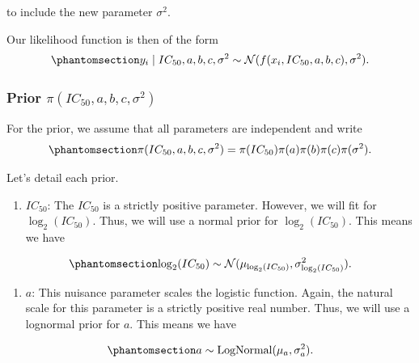 \documentclass[
]{scrartcl}
\providecommand{\tightlist}{%
  \setlength{\itemsep}{0pt}\setlength{\parskip}{0pt}}\usepackage{longtable,booktabs,array}
\begin{document}
to include the new parameter \(\sigma^2\).

Our likelihood function is then of the form
\begin{equation}\phantomsection\label{eq-iwasawa-likelihood-error-model}{
y_i \mid IC_{50}, a, b, c, \sigma^2 \sim 
\mathcal{N}(f(x_i, IC_{50}, a, b, c), \sigma^2).
}\end{equation}

\subsubsection{\texorpdfstring{Prior
\(\pi(IC_{50}, a, b, c, \sigma^2)\)}{Prior \textbackslash pi(IC\_\{50\}, a, b, c, \textbackslash sigma\^{}2)}}\label{prior-piic_50-a-b-c-sigma2}

For the prior, we assume that all parameters are independent and write
\begin{equation}\phantomsection\label{eq-iwasawa-prior}{
\pi(IC_{50}, a, b, c, \sigma^2) = 
\pi(IC_{50}) \pi(a) \pi(b) \pi(c) \pi(\sigma^2).
}\end{equation}

Let's detail each prior.

\begin{enumerate}
\def\labelenumi{\arabic{enumi}.}
\tightlist
\item
  \(IC_{50}\): The \(IC_{50}\) is a strictly positive parameter.
  However, we will fit for \(\log_2(IC_{50})\). Thus, we will use a
  normal prior for \(\log_2(IC_{50})\). This means we have
\end{enumerate}

\begin{equation}\phantomsection\label{eq-iwasawa-prior-ic50}{
\log_2(IC_{50}) \sim 
\mathcal{N}(
    \mu_{\log_2(IC_{50})}, \sigma_{\log_2(IC_{50})}^2
).
}\end{equation}

\begin{enumerate}
\def\labelenumi{\arabic{enumi}.}
\setcounter{enumi}{1}
\tightlist
\item
  \(a\): This nuisance parameter scales the logistic function. Again,
  the natural scale for this parameter is a strictly positive real
  number. Thus, we will use a lognormal prior for \(a\). This means we
  have
\end{enumerate}

\begin{equation}\phantomsection\label{eq-iwasawa-prior-a}{
a \sim \text{LogNormal}(\mu_a, \sigma_a^2).
}\end{equation}
\end{document}
